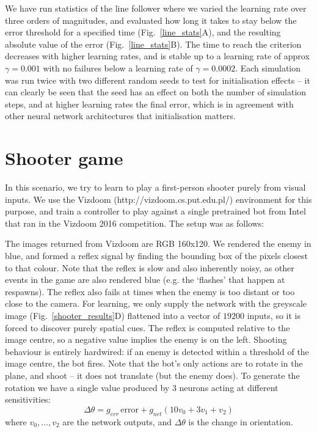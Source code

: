 \documentclass[Afour,sageh,times]{sagej}
\begin{document}
We have run statistics of the line follower where we varied the
learning rate over three orders of magnitudes, and evaluated how long
it takes to stay below the error threshold for a specified time
(Fig.~\ref{line_stats}A), and the resulting absolute value of the
error (Fig.~\ref{line_stats}B). The time to reach the criterion
decreases with higher learning rates, and is stable up to a learning
rate of approx $\gamma = 0.001$ with no failures below a learning rate of
$\gamma = 0.0002$. Each simulation was run twice with two different random seeds to
test for initialisation effects -- it can clearly be seen that
the seed has an effect on both the number of simulation steps,
and at higher learning rates the final error, which is in agreement with other neural
network architectures that initialisation matters.


\section{Shooter game}
In this scenario, we try to learn to play a first-person shooter
purely from visual inputs. We use the Vizdoom
(http://vizdoom.cs.put.edu.pl/) environment for this purpose, and
train a controller to play against a single pretrained bot from Intel
that ran in the Vizdoom 2016 competition. The setup was as follows:

The images returned from Vizdoom are RGB 160x120. We rendered the
enemy in blue, and formed a reflex signal by finding the bounding box
of the pixels closest to that colour. Note that the reflex is slow and
also inherently noisy, as other events in the game are also rendered
blue (e.g. the ‘flashes’ that happen at respawns). The reflex also
fails at times when the enemy is too distant or too close to the
camera. For learning, we only supply the network with the greyscale
image (Fig.~\ref{shooter_results}D) flattened into a vector of $19200$
inputs, so it is forced to discover purely spatial cues. The reflex is
computed relative to the image centre, so a negative value implies the
enemy is on the left. Shooting behaviour is entirely hardwired: if an
enemy is detected within a threshold of the image centre, the bot
fires. Note that the bot's only actions are to rotate in the plane,
and shoot -- it does not translate (but the enemy does). To generate
the rotation we have a single value produced by 3 neurons acting at
different sensitivities:
\begin{equation}
\Delta \theta = g_{err}\, \mathrm{error} + g_{net} \left( 10 v_0 + 3 v_1 + v_2 \right)
\end{equation}
where $v_0, \ldots, v_2$ are the network outputs, and $\Delta \theta$
is the change in orientation.
\end{document}
